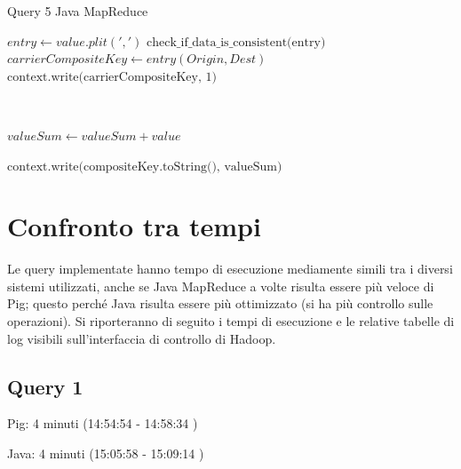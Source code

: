 \documentclass[11pt]{article} %
\begin{document}
\begin{algorithm}
\caption{Query 5 Java MapReduce}\label{euclid}
\begin{algorithmic}[0]


\State $entry \gets value.plit(',')$
\State $\text{check\_if\_data\_is\_consistent(entry)}$
\State $carrierCompositeKey \gets entry(Origin, Dest)$
\State $\text{context.write(carrierCompositeKey, 1)}$

\EndProcedure

~


	\State $valueSum \gets valueSum + value$
\EndFor

\State $\text{context.write(compositeKey.toString(), valueSum)}$

\EndProcedure


\end{algorithmic}
\end{algorithm}


\section{Confronto tra tempi}

Le query implementate hanno tempo di esecuzione mediamente simili tra i diversi sistemi utilizzati, anche se Java MapReduce a volte risulta essere più veloce di Pig; questo perché Java risulta essere più ottimizzato (si ha più controllo sulle operazioni). Si riporteranno di seguito i tempi di esecuzione e le relative tabelle di log visibili sull'interfaccia di controllo di Hadoop.

\subsection{Query 1}

Pig: 4 minuti	 (14:54:54 - 14:58:34 )

Java: 4 minuti	 (15:05:58 - 15:09:14 )
\end{document}
